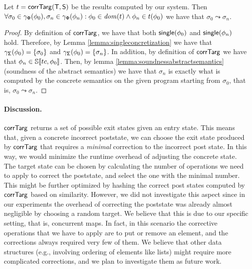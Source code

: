 \begin{theorem}
	Let $t=\mathsf{corrTarg}(\mathsf{T}, \mathsf{S})$ be the results computed by our system. Then $\forall \sigma_0 \in \gamma_{\mathsf{\Phi}}(\phi_0), \sigma_n \in \gamma_{\mathsf{\Phi}}(\phi_n) : \phi_0 \in \mathit{dom}(t) \land \phi_n \in t(\phi_0)$ we have that $\sigma_0 \leadsto \sigma_n$.
\end{theorem}
\begin{proof}
By definition of $\mathsf{corrTarg}$, we have that both $\mathsf{single}(\phi_0)$ and $\mathsf{single}(\phi_n)$ hold. Therefore, by Lemma \ref{lemma:singleconcretization} we have that $\gamma_{\mathsf{\Sigma}}(\phi_0) = \{\sigma_0\}$ and $\gamma_{\mathsf{\Sigma}}(\phi_0) = \{\sigma_n\}$. In addition, by definition of $\mathsf{corrTarg}$ we have that $\phi_n \in \mathbb{S}\llbracket tc, \phi_0 \rrbracket$. Then, by lemma \ref{lemma:soundnessabstractsemantics} (soundness of the abstract semantics) we have that $\sigma_n$ is exactly what is computed by the concrete semantics on the given program starting from $\sigma_0$, that is, $\sigma_0 \leadsto \sigma_n$. 
\end{proof}



\paragraph{Discussion.}
$\mathsf{corrTarg}$ returns a set of possible exit states given an entry state. This means that, given a concrete incorrect poststate, we can choose the exit state produced by $\mathsf{corrTarg}$ that requires a \emph{minimal} correction to the incorrect post state. In this way, we would minimize the runtime overhead of adjusting the concrete state. The target state can be chosen by calculating the number of operations we need to apply to correct the poststate, and select the one with the minimal number. This might be further optimized by hashing the correct post states computed by $\mathsf{corrTarg}$ based on similarity.
However, we did not investigate this aspect since in our experiments the overhead of correcting the poststate was already almost negligible by choosing a random target. We believe that this is due to our specific setting, that is, concurrent maps. In fact, in this scenario the corrective operations that we have to apply are to put or remove an element, and the corrections always required very few of them. We believe that other data structures (e.g., involving ordering of elements like lists) might require more complicated corrections, and we plan to investigate them as future work.


